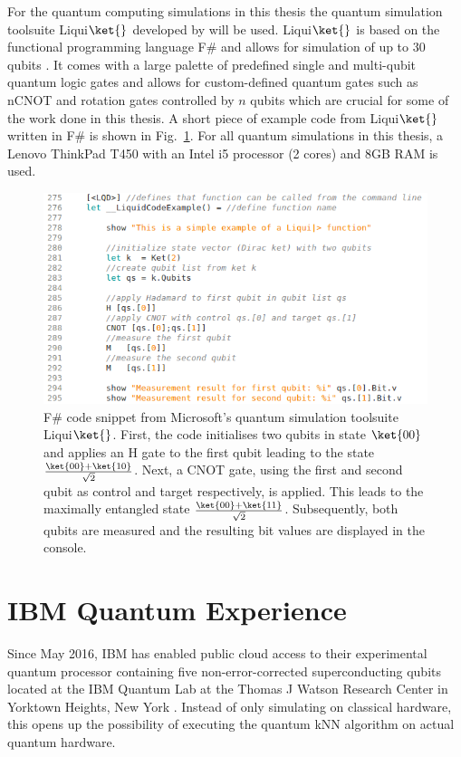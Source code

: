 For the quantum computing simulations in this thesis the quantum simulation toolsuite Liqui$\ket{}$ developed by  will be used. Liqui$\ket{}$ is based on the functional programming language F\# and allows for simulation of up to 30 qubits \cite{microsoftresearch}. It comes with a large palette of predefined single and multi-qubit quantum logic gates and allows for custom-defined quantum gates such as nCNOT and rotation gates controlled by $n$ qubits which are crucial for some of the work done in this thesis. A short piece of example code from Liqui$\ket{}$ written in F\# is shown in Fig.~\ref{fig:liquidsnippet}. For all quantum simulations in this thesis, a Lenovo ThinkPad T450 with an Intel i5 processor (2 cores) and 8GB RAM is used.

\begin{figure}[H]
      \centering
       \includegraphics[scale=0.6]{img/liquidcodesnippet.png}
       \caption{\label{fig:liquidsnippet} F\# code snippet from Microsoft's quantum simulation toolsuite Liqui$\ket{}$. First, the code initialises two qubits in state $\ket{00}$ and applies an H gate to the first qubit leading to the state $\frac{\ket{00}+\ket{10}}{\sqrt{2}}$. Next, a CNOT gate, using the first and second qubit as control and target respectively, is applied. This leads to the maximally entangled state $\frac{\ket{00}+\ket{11}}{\sqrt{2}}$. Subsequently, both qubits are measured and the resulting bit values are displayed in the console.}
\end{figure}

\section{IBM Quantum Experience}
\label{subsec:ibmqc}

Since May 2016, IBM has enabled public cloud access to their experimental quantum processor containing five non-error-corrected superconducting qubits located at the IBM Quantum Lab at the Thomas J Watson Research Center in Yorktown Heights, New York \cite{ibmquantumcomputer}. Instead of only simulating on classical hardware, this opens up the possibility of executing the quantum kNN algorithm on actual quantum hardware.

